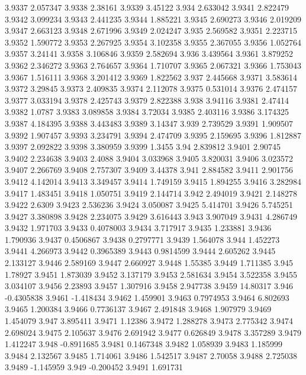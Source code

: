 3.9337  2.057347
3.9338  2.38161
3.9339  3.45122
3.934  2.633042
3.9341  2.822479
3.9342  3.099234
3.9343  2.441235
3.9344  1.885221
3.9345  2.690273
3.9346  2.019209
3.9347  2.663123
3.9348  2.671996
3.9349  2.024247
3.935  2.569582
3.9351  2.223715
3.9352  1.590772
3.9353  2.267925
3.9354  3.102358
3.9355  2.367055
3.9356  1.052764
3.9357  3.24141
3.9358  3.106846
3.9359  2.582694
3.936  3.439564
3.9361  3.879252
3.9362  2.346272
3.9363  2.764657
3.9364  1.710707
3.9365  2.067321
3.9366  1.753043
3.9367  1.516111
3.9368  3.201412
3.9369  1.822562
3.937  2.445668
3.9371  3.583614
3.9372  3.29845
3.9373  2.409835
3.9374  2.112078
3.9375  0.531014
3.9376  2.474157
3.9377  3.033194
3.9378  2.425743
3.9379  2.822388
3.938  3.94116
3.9381  2.47414
3.9382  1.0787
3.9383  3.089858
3.9384  3.72034
3.9385  2.403116
3.9386  3.174325
3.9387  4.184395
3.9388  3.443483
3.9389  3.14347
3.939  2.739529
3.9391  1.909507
3.9392  1.907457
3.9393  3.234791
3.9394  2.474709
3.9395  2.159695
3.9396  1.812887
3.9397  2.092822
3.9398  3.380959
3.9399  1.3455
3.94  2.839812
3.9401  2.90745
3.9402  2.234638
3.9403  2.4088
3.9404  3.033968
3.9405  3.820031
3.9406  3.023572
3.9407  2.266769
3.9408  2.757307
3.9409  3.44378
3.941  2.884582
3.9411  2.901756
3.9412  4.142014
3.9413  3.349457
3.9414  1.749159
3.9415  1.894255
3.9416  3.282984
3.9417  1.483451
3.9418  1.050751
3.9419  2.144714
3.942  2.494019
3.9421  2.148278
3.9422  2.6309
3.9423  2.536236
3.9424  3.050087
3.9425  5.414701
3.9426  5.745251
3.9427  3.380898
3.9428  2.234075
3.9429  3.616443
3.943  3.907049
3.9431  4.286749
3.9432  1.971703
3.9433  0.4078003
3.9434  3.717917
3.9435  1.233881
3.9436  1.790936
3.9437  0.4506867
3.9438  0.2797771
3.9439  1.564078
3.944  1.452273
3.9441  4.266973
3.9442  0.3965389
3.9443  0.9814599
3.9444  2.605262
3.9445  2.133127
3.9446  2.589169
3.9447  2.660927
3.9448  1.55385
3.9449  1.711385
3.945  1.78927
3.9451  1.873039
3.9452  3.137179
3.9453  2.581634
3.9454  3.522358
3.9455  3.034107
3.9456  2.23893
3.9457  1.307916
3.9458  2.947738
3.9459  14.80317
3.946  -0.4305838
3.9461  -1.418434
3.9462  1.459901
3.9463  0.7974953
3.9464  6.802693
3.9465  1.200384
3.9466  0.7736137
3.9467  2.491848
3.9468  1.907979
3.9469  1.454079
3.947  3.895411
3.9471  1.12386
3.9472  1.288278
3.9473  2.775342
3.9474  2.698024
3.9475  2.105637
3.9476  2.691942
3.9477  0.626849
3.9478  3.357289
3.9479  1.412247
3.948  -0.8911685
3.9481  0.1467348
3.9482  1.058939
3.9483  1.185999
3.9484  2.132567
3.9485  1.714061
3.9486  1.542517
3.9487  2.70058
3.9488  2.725038
3.9489  -1.145959
3.949  -0.200452
3.9491  1.691731

